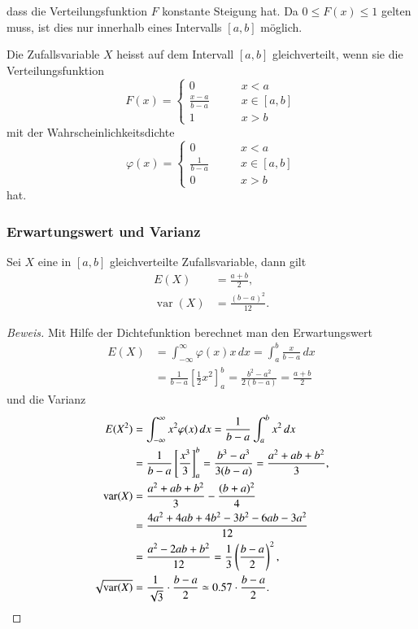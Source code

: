 dass die Verteilungsfunktion $F$ konstante Steigung hat.
Da $0\le F(x)\le 1$
gelten muss, ist dies nur innerhalb eines Intervalls $[a,b]$ möglich.
\begin{definition}Die Zufallsvariable $X$ heisst auf dem Intervall
$[a,b]$ gleichverteilt, wenn sie die Verteilungsfunktion
\[
F(x)=\begin{cases}
0&\qquad x< a\\
\displaystyle \frac{x-a}{b-a}&\qquad x\in[a,b]\\
1&\qquad x> b
\end{cases}
\]
mit der Wahrscheinlichkeitsdichte
\[
\varphi(x)=\begin{cases}
0&\qquad x< a\\
\displaystyle \frac1{b-a}&\qquad x\in[a,b]\\
0&\qquad x> b
\end{cases}
\]
hat.
\end{definition}

\subsubsection{Erwartungswert und Varianz}
\begin{satz}Sei $X$ eine in $[a,b]$ gleichverteilte Zufallsvariable,
dann gilt
\begin{align*}
E(X)
&=
\frac{a+b}2,\\
\operatorname{var}(X)
&=
\frac{(b-a)^2}{12}.
\end{align*}
\end{satz}
\begin{proof}[Beweis]
Mit Hilfe der Dichtefunktion berechnet man den Erwartungswert
\begin{align*}
E(X)
&=
\int_{-\infty}^\infty \varphi(x)x\,dx
=
\int_a^b\frac{x}{b-a}\,dx\\
&=
\frac1{b-a}\left[\frac12x^2\right]_a^b
=
\frac{b^2-a^2}{2(b-a)}
=
\frac{a+b}2
\end{align*}
und die Varianz
\begin{align*}
E(X^2)
&=
\int_{-\infty}^\infty x^2\varphi(x)\,dx=\frac1{b-a}\int_a^bx^2\,dx\\
&=
\frac1{b-a}\left[\frac{x^3}3\right]_a^b
=
\frac{b^3-a^3}{3(b-a)}=\frac{a^2+ab+b^2}3,\\
\operatorname{var}(X)
&=
\frac{a^2+ab+b^2}3-\frac{(b+a)^2}4\\
&=
\frac{4a^2+4ab+4b^2-3b^2-6ab-3a^2}{12}\\
&=
\frac{a^2-2ab+b^2}{12}=\frac13\left(\frac{b-a}2\right)^2,\\
\sqrt{\operatorname{var}(X)}
&=
\frac1{\sqrt{3}}\cdot\frac{b-a}2\simeq 0.57\cdot\frac{b-a}2.
\qedhere
\end{align*}
\end{proof}

